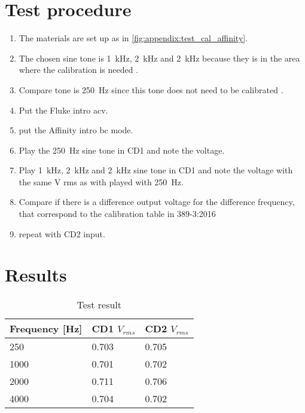 \section*{Test procedure}


\begin{enumerate}
\item The materials are set up as in \autoref{fig:appendix:test_cal_affinity}.
\item The chosen sine tone is \SI{1}{\kilo\hertz}, \SI{2}{\kilo\hertz} and \SI{2}{\kilo\hertz} because they is in the area where the calibration is needed \citep{radioear_b81}.
\item Compare tone is \SI{250}{\hertz} since this tone does not need to be calibrated \citep{radioear_b81}.
\item Put the Fluke intro \gls{acv}. 
\item put the Affinity intro \gls{bc} mode.
\item  Play the \SI{250}{\hertz} sine tone in CD1 and note the voltage.
\item  Play  \SI{1}{\kilo\hertz}, \SI{2}{\kilo\hertz} and \SI{2}{\kilo\hertz} sine tone in CD1 and note the voltage with the same \si{\volt} \gls{rms} as with played with \SI{250}{\hertz}.
\item Compare if there is a difference output voltage for the difference frequency, that correspond to the calibration table in 389-3:2016 \citep{iso_389-3}
\item repeat with CD2 input.
\end{enumerate}

\section*{Results}

\begin{table}[H]
\centering
\caption{Test result}
\begin{tabular}{l|ll}
Frequency [\si{\hertz}] & CD1 $V_{rms}$ & CD2 $V_{rms}$ \\ \hline
250                     & 0.703         & 0.705         \\
1000                    & 0.701         & 0.702         \\
2000                    & 0.711         & 0.706         \\
4000                    & 0.704         & 0.702        
\end{tabular}
\label{tab:append_cal_anal_affinity}
\end{table}

